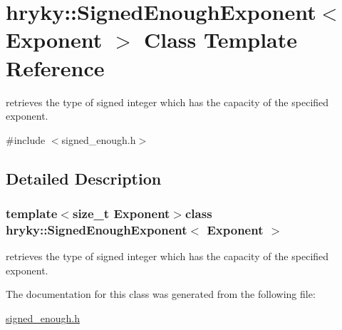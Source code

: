 \hypertarget{classhryky_1_1_signed_enough_exponent}{\section{hryky\-:\-:Signed\-Enough\-Exponent$<$ Exponent $>$ Class Template Reference}
\label{classhryky_1_1_signed_enough_exponent}
}


retrieves the type of signed integer which has the capacity of the specified exponent.  




{\ttfamily \#include $<$signed\-\_\-enough.\-h$>$}



\subsection{Detailed Description}
\subsubsection*{template$<$size\-\_\-t Exponent$>$class hryky\-::\-Signed\-Enough\-Exponent$<$ Exponent $>$}

retrieves the type of signed integer which has the capacity of the specified exponent. 

The documentation for this class was generated from the following file\-:\begin{DoxyCompactItemize}
\item 
\hyperlink{signed__enough_8h}{signed\-\_\-enough.\-h}\end{DoxyCompactItemize}
